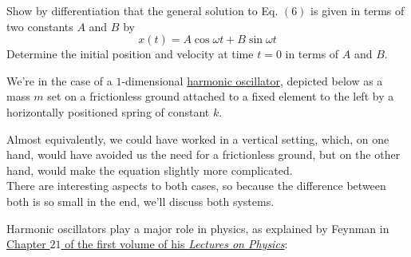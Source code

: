\documentclass[solutions.tex]{subfiles}
\begin{document}
\maketitle
\begin{exercise}
Show by differentiation that the general solution to Eq. $(6)$
is given in terms of two constants $A$ and $B$ by
\[
	x(t) = A\cos\omega t + B\sin\omega t
\]
Determine the initial position and velocity at time $t=0$ in terms
of $A$ and $B$.
\end{exercise}
We're in the case of a $1$-dimensional
\href{https://en.wikipedia.org/wiki/Harmonic\_oscillator}
{harmonic oscillator}, depicted below as a mass $m$ set on a frictionless
ground attached to a fixed element to the left by a horizontally positioned
spring of constant $k$.
\begin{figure}[H]
	\centering
\end{figure}
\begin{remark}
Almost equivalently, we could have worked in a vertical setting, which, on
one hand, would have avoided us the need for a frictionless ground, but
on the other hand, would make the equation slightly more complicated. \\

There are interesting aspects to both cases, so because the
difference between both is so small in the end, we'll discuss both systems.
\end{remark}

Harmonic oscillators play a major role in physics, as explained by Feynman
in \href{https://www.feynmanlectures.caltech.edu/I\_21.html}{Chapter $21$
of the first volume of his \textit{Lectures on Physics}}:
\end{document}
